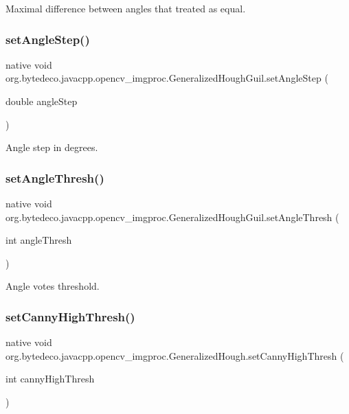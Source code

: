 Maximal difference between angles that treated as equal. \mbox{\label{group__imgproc_ga68165aad724a0130724caaa5cbe49aeb}} 
\subsubsection{\texorpdfstring{set\+Angle\+Step()}{setAngleStep()}}
{\footnotesize\ttfamily native void org.\+bytedeco.\+javacpp.\+opencv\+\_\+imgproc.\+Generalized\+Hough\+Guil.\+set\+Angle\+Step (\begin{DoxyParamCaption}\item[{double}]{angle\+Step }\end{DoxyParamCaption})}

Angle step in degrees. \mbox{\label{group__imgproc_gaeba2e2313c8d860e626dd7225d07fca3}} 
\subsubsection{\texorpdfstring{set\+Angle\+Thresh()}{setAngleThresh()}}
{\footnotesize\ttfamily native void org.\+bytedeco.\+javacpp.\+opencv\+\_\+imgproc.\+Generalized\+Hough\+Guil.\+set\+Angle\+Thresh (\begin{DoxyParamCaption}\item[{int}]{angle\+Thresh }\end{DoxyParamCaption})}

Angle votes threshold. \mbox{\label{group__imgproc_gaa001df9ff64a9ea3e521e5218702134f}} 
\subsubsection{\texorpdfstring{set\+Canny\+High\+Thresh()}{setCannyHighThresh()}}
{\footnotesize\ttfamily native void org.\+bytedeco.\+javacpp.\+opencv\+\_\+imgproc.\+Generalized\+Hough.\+set\+Canny\+High\+Thresh (\begin{DoxyParamCaption}\item[{int}]{canny\+High\+Thresh }\end{DoxyParamCaption})}

